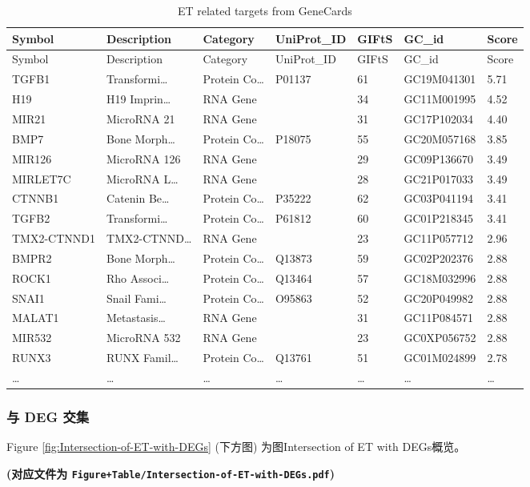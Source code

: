 \documentclass[
]{article}
\begin{document}
\begin{longtable}[]{@{}lllllll@{}}
\caption{\label{tab:ET-related-targets-from-GeneCards}ET related targets from GeneCards}\tabularnewline
\toprule
Symbol & Description & Category & UniProt\_ID & GIFtS & GC\_id & Score\tabularnewline
\midrule
\endfirsthead
\toprule
Symbol & Description & Category & UniProt\_ID & GIFtS & GC\_id & Score\tabularnewline
\midrule
\endhead
TGFB1 & Transformi\ldots{} & Protein Co\ldots{} & P01137 & 61 & GC19M041301 & 5.71\tabularnewline
H19 & H19 Imprin\ldots{} & RNA Gene & & 34 & GC11M001995 & 4.52\tabularnewline
MIR21 & MicroRNA 21 & RNA Gene & & 31 & GC17P102034 & 4.40\tabularnewline
BMP7 & Bone Morph\ldots{} & Protein Co\ldots{} & P18075 & 55 & GC20M057168 & 3.85\tabularnewline
MIR126 & MicroRNA 126 & RNA Gene & & 29 & GC09P136670 & 3.49\tabularnewline
MIRLET7C & MicroRNA L\ldots{} & RNA Gene & & 28 & GC21P017033 & 3.49\tabularnewline
CTNNB1 & Catenin Be\ldots{} & Protein Co\ldots{} & P35222 & 62 & GC03P041194 & 3.41\tabularnewline
TGFB2 & Transformi\ldots{} & Protein Co\ldots{} & P61812 & 60 & GC01P218345 & 3.41\tabularnewline
TMX2-CTNND1 & TMX2-CTNND\ldots{} & RNA Gene & & 23 & GC11P057712 & 2.96\tabularnewline
BMPR2 & Bone Morph\ldots{} & Protein Co\ldots{} & Q13873 & 59 & GC02P202376 & 2.88\tabularnewline
ROCK1 & Rho Associ\ldots{} & Protein Co\ldots{} & Q13464 & 57 & GC18M032996 & 2.88\tabularnewline
SNAI1 & Snail Fami\ldots{} & Protein Co\ldots{} & O95863 & 52 & GC20P049982 & 2.88\tabularnewline
MALAT1 & Metastasis\ldots{} & RNA Gene & & 31 & GC11P084571 & 2.88\tabularnewline
MIR532 & MicroRNA 532 & RNA Gene & & 23 & GC0XP056752 & 2.88\tabularnewline
RUNX3 & RUNX Famil\ldots{} & Protein Co\ldots{} & Q13761 & 51 & GC01M024899 & 2.78\tabularnewline
\ldots{} & \ldots{} & \ldots{} & \ldots{} & \ldots{} & \ldots{} & \ldots{}\tabularnewline
\bottomrule
\end{longtable}

\hypertarget{ux4e0e-deg-ux4ea4ux96c6}{%
\subsubsection{与 DEG 交集}\label{ux4e0e-deg-ux4ea4ux96c6}}

Figure \ref{fig:Intersection-of-ET-with-DEGs} (下方图) 为图Intersection of ET with DEGs概览。

\textbf{(对应文件为 \texttt{Figure+Table/Intersection-of-ET-with-DEGs.pdf})}
\end{document}
